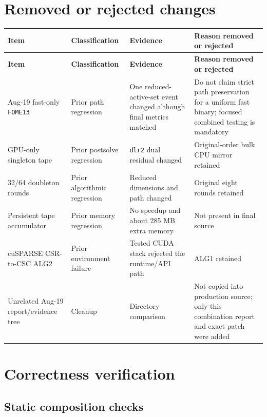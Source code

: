 \documentclass[10pt,a4paper]{article}
\begin{document}
\section{Removed or rejected changes}

\scriptsize
\begin{longtable}{@{}P{0.23\textwidth}P{0.18\textwidth}P{0.24\textwidth}P{0.27\textwidth}@{}}
\toprule
\textbf{Item} & \textbf{Classification} & \textbf{Evidence} & \textbf{Reason removed or rejected}\\
\midrule
\endfirsthead
\toprule
\textbf{Item} & \textbf{Classification} & \textbf{Evidence} & \textbf{Reason removed or rejected}\\
\midrule
\endhead
Aug-19 fast-only \texttt{FOME13} & Prior path regression & One reduced-active-set event changed although final metrics matched & Do not claim strict path preservation for a uniform fast binary; focused combined testing is mandatory\\
GPU-only singleton tape & Prior postsolve regression & \texttt{dlr2} dual residual changed & Original-order bulk CPU mirror retained\\
32/64 doubleton rounds & Prior algorithmic regression & Reduced dimensions and path changed & Original eight rounds retained\\
Persistent tape accumulator & Prior memory regression & No speedup and about 285 MB extra memory & Not present in final source\\
cuSPARSE CSR-to-CSC ALG2 & Prior environment failure & Tested CUDA stack rejected the runtime/API path & ALG1 retained\\
Unrelated Aug-19 report/evidence tree & Cleanup & Directory comparison & Not copied into production source; only this combination report and exact patch were added\\
\bottomrule
\end{longtable}
\normalsize

\section{Correctness verification}

\subsection{Static composition checks}
\end{document}

